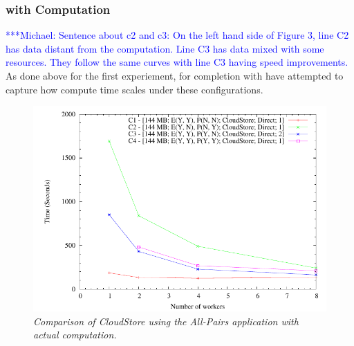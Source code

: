 \documentclass{rspublic}
\newcommand{\micnote}[1]{ {\textcolor{blue} { ***Michael: #1 }}} \else
\begin{document}
\subsubsection{with Computation}  \micnote{Sentence about c2 and c3:  On
the left hand side of Figure 3, line C2 has data distant from the
computation.  Line C3 has data mixed with some resources.  They follow
the same curves with line C3 having speed improvements.} As done above
for the first experiement, for completion with have attempted to capture
how compute time scales under these configurations.
\begin{center}
\begin{figure}
\includegraphics[scale=.75]{data/graphs/CloudStoreCompute}
\caption{\textit{Comparison of CloudStore using the All-Pairs
application with actual computation.}}
\label{experiment3compute}
\end{figure}
\end{center}


\end{document}
